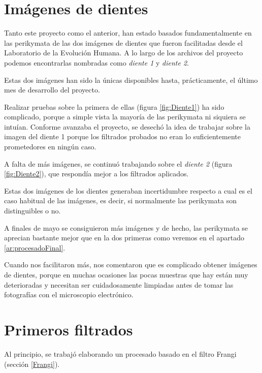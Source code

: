 \section{Imágenes de dientes}
Tanto este proyecto como el anterior, han estado basados fundamentalmente en las perikymata de las dos imágenes de dientes que fueron facilitadas desde el Laboratorio de la Evolución Humana. A lo largo de los archivos del proyecto podemos encontrarlas nombradas como \textit{diente 1} y \textit{diente 2}. 

Estas dos imágenes han sido la únicas disponibles hasta, prácticamente, el último mes de desarrollo del proyecto.

Realizar pruebas sobre la primera de ellas (figura \ref{fig:Diente1}) ha sido complicado, porque a simple vista la mayoría de las perikymata ni siquiera se intuían. Conforme avanzaba el proyecto, se desechó la idea de trabajar sobre la imagen del diente 1 porque los filtrados probados no eran lo suficientemente prometedores en ningún caso.

A falta de más imágenes, se continuó trabajando sobre el \textit{diente 2} (figura \ref{fig:Diente2}), que respondía mejor a los filtrados aplicados.

Estas dos imágenes de los dientes generaban incertidumbre respecto a cual es el caso habitual de las imágenes, es decir, si normalmente las perikymata son distinguibles o no.

\newpage
A finales de mayo se consiguieron más imágenes y de hecho, las perikymata se aprecian bastante mejor que en la dos primeras como veremos en el apartado \ref{ar:procesadoFinal}. 

Cuando nos facilitaron más, nos comentaron que es complicado obtener imágenes de dientes, porque en muchas ocasiones las pocas muestras que hay están muy deterioradas y necesitan ser cuidadosamente limpiadas antes de tomar las fotografías con el microscopio electrónico.


\section{Primeros filtrados}
\label{ar:PrimerosFiltrados}

Al principio, se trabajó elaborando un procesado basado en el filtro Frangi (sección \ref{Frangi}).

